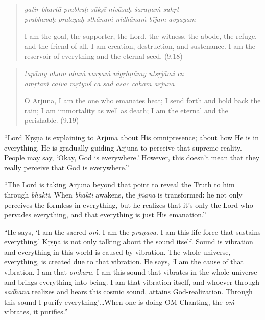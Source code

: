 \documentclass[12pt, twoside, openright]{memoir}
\begin{document}
\par
\begin{verse}
\textit{gatir bhartā prabhuḥ sākṣī nivāsaḥ śaraṇaṁ suhṛt} \\
\textit{prabhavaḥ pralayaḥ sthānaṁ nidhānaṁ bījam avyayam}

\noindent I am the goal, the supporter, the Lord, the witness, the abode, the refuge, and the friend of all. I am creation, destruction, and sustenance. I am the reservoir of everything and the eternal seed. (9.18)
\end{verse}
\par



\par
\begin{verse}
\textit{tapāmy aham ahaṁ varṣaṁ nigṛhṇāmy utsṛjāmi ca} \\
\textit{amṛtaṁ caiva mṛtyuś ca sad asac cāham arjuna}

\noindent O Arjuna, I am the one who emanates heat; I send forth and hold back the rain; I am immortality as well as death; I am the eternal and the perishable. (9.19)
\end{verse}
\par



\enquote{Lord Kṛṣṇa is explaining to Arjuna about His omnipresence; about how He is in everything. He is gradually guiding Arjuna to perceive that supreme reality. People may say, \enquote{Okay, God is everywhere.} However, this doesn’t mean that they really perceive that God is everywhere.}

\enquote{The Lord is taking Arjuna beyond that point to reveal the Truth to him through \textit{bhakti}. When \textit{bhakti} awakens, the \textit{jñāna} is transformed: he not only perceives the formless in everything, but he realizes that it’s only the Lord who pervades everything, and that everything is just His emanation.}

\enquote{He says, \enquote{I am the sacred \textit{oṁ}. I am the \textit{praṇava}. I am this life force that sustains everything.} Kṛṣṇa is not only talking about the sound itself. Sound is vibration and everything in this world is caused by vibration. The whole universe, everything, is created due to that vibration. He says, \enquote{I am the cause of that vibration. I am that \textit{oṁkāra}. I am this sound that vibrates in the whole universe and brings everything into being. I am that vibration itself, and whoever through \textit{sādhana} realizes and hears this cosmic sound, attains God-realization. Through this sound I purify everything}\ldots When one is doing OM Chanting, the \textit{oṁ} vibrates, it purifies.}
\end{document}
